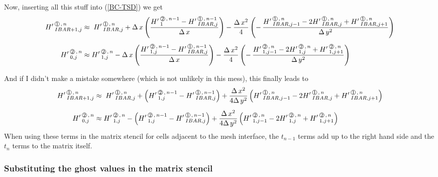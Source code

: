 Now, inserting all this stuff into (\ref{BC-TSD}) we get
\begin{align}
\label{BC-TSF}
\HL{IBAR+1,j}{1}{n} & \approx \;  \HL{IBAR,j}{1}{n}  + \DX \left( \frac{\HL{1}{2}{n-1} - \HL{IBAR,j}{1}{n-1}} {\DX}\right)
                                                      - \frac{\DXT}{4}   \left(-\,\frac{\HL{IBAR,j-1}{1}{n} - 2 \HL{IBAR,j}{1}{n} + \HL{IBAR,j+1}{1}{n}}{\DYT} \right)
 \\[1ex]
\HL{0,j}{2}{n} & \approx  \HL{1,j}{2}{n}  - \DX \left(\frac{\HL{1,j}{2}{n-1} - \HL{IBAR,j}{1}{n-1}} {\DX}\right)
                                                - \frac{\DXT}{4} \left(-\,\frac{\HL{1,j-1}{2}{n} - 2 \HL{1,j}{2}{n} + \HL{1,j+1}{2}{n}}{\DYT}  \right)    \nonumber                                           
\end{align}

And if I didn't make a mistake somewhere (which is not unlikely in this mess), this finally leads to
\begin{align}
\label{BC-TSF}
\HL{IBAR+1,j}{1}{n} & \approx \;  \HL{IBAR,j}{1}{n}  + \left(\HL{1,j}{2}{n-1} - \HL{IBAR,j}{1}{n-1}\right) 
                                                + \frac{\DXT}{4\DYT}   \left(\HL{IBAR,j-1}{1}{n} - 2 \HL{IBAR,j}{1}{n} + \HL{IBAR,j+1}{1}{n} \right) \\[1ex]
\HL{0,j}{2}{n} & \approx  \HL{1,j}{2}{n}  - \left( \HL{1,j}{2}{n-1} - \HL{IBAR,j}{1}{n-1}\right)
                                                + \frac{\DXT}{4\DYT}   \left(\HL{1,j-1}{2}{n} - 2 \HL{1,j}{2}{n} + \HL{1,j+1}{2}{n}\right)      \nonumber                                           
\end{align}
When using these terms in the matrix stencil for cells adjacent to the mesh interface, the $t_{n-1}$ terms add up to the right hand side and the $t_n$ terms to the matrix itself.

\subsubsection{Substituting the ghost values in the matrix stencil}
%
